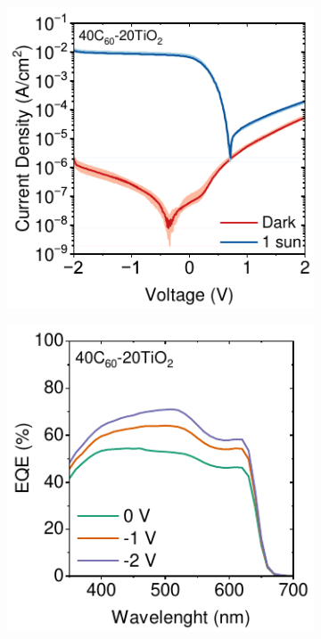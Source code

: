 \begin{figure}[htbp]
    \centering
    \begin{subfigure}{0.32\textwidth}
        \centering
        \includegraphics[width=\textwidth]{chapters/transport_layers/images/JV_40C60_20TiO2.pdf}
        \caption{}
        \label{}
    \end{subfigure}
    \hfill
    \begin{subfigure}{0.32\textwidth}
        \centering
        \includegraphics[width=\textwidth]{chapters/transport_layers/images/EQE_40C60_20TiO2.pdf}

\end{subfigure}
\end{figure}
